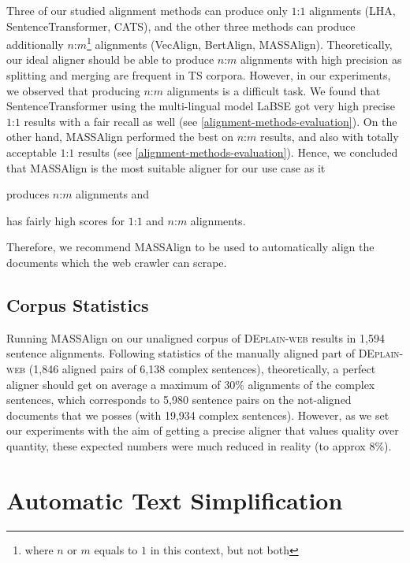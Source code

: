 \documentclass[11pt]{article}
\begin{document}
Three of our studied alignment methods can produce only $1$:$1$ alignments (LHA, SentenceTransformer, CATS), and the other three methods can produce additionally $n$:$m$\footnote{where $n$ or $m$ equals to $1$ in this context, but not both} alignments (VecAlign, BertAlign, MASSAlign). Theoretically, our ideal aligner should be able to produce $n$:$m$ alignments with high precision as splitting and merging are frequent in TS corpora. However, in our experiments, we observed that producing $n$:$m$ alignments is a difficult task. We found that SentenceTransformer using the multi-lingual model LaBSE \cite{feng-etal-2022-language} got very high precise $1$:$1$ results with a fair recall as well (see \autoref{alignment-methods-evaluation}). On the other hand, MASSAlign performed the best on $n$:$m$ results, and also with totally acceptable $1$:$1$ results (see \autoref{alignment-methods-evaluation}). Hence, we concluded that MASSAlign is the most suitable aligner for our use case as it 
\begin{enumerate*}[label=\roman*)]
    \item produces $n$:$m$ alignments and 
    \item has fairly high scores for $1$:$1$ and $n$:$m$ alignments.
\end{enumerate*}
Therefore, we recommend MASSAlign to be used to automatically align the documents which the web crawler can scrape. 


\subsection{Corpus Statistics}

Running MASSAlign on our unaligned corpus of \textsc{DEplain-web} results in 1,594 sentence alignments. Following statistics of the manually aligned part of \textsc{DEplain-web} (1,846 aligned pairs of 6,138 complex sentences), theoretically, a perfect aligner should get on average a maximum of 30\% alignments of the complex sentences, which corresponds to 5,980 sentence pairs on the not-aligned documents that we posses (with 19,934 complex sentences). However, as we set our experiments with the aim of getting a precise aligner that values quality over quantity, these expected numbers were much reduced in reality (to approx 8\%). 



\section{Automatic Text Simplification}
\label{sec-ats}
\end{document}
